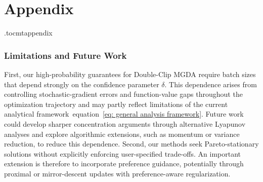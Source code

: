 \documentclass[twoside]{article} %
\def\eqref#1{equation~\ref{#1}}
\theoremstyle{plain}
\theoremstyle{definition}
\theoremstyle{remark}
\begin{document}
\clearpage
\appendix
\onecolumn

\part*{Appendix}

\etocdepthtag.toc{mtappendix}
\etocsettocstyle
  {}
  {\vspace{1em}}
\tableofcontents
\clearpage

\allowdisplaybreaks
\section{Limitations and Future Work}
First, our high-probability guarantees for Double-Clip MGDA require batch sizes that depend strongly on the confidence parameter \(\delta\). This dependence arises from controlling stochastic-gradient errors and function-value gaps throughout the optimization trajectory and may partly reflect limitations of the current analytical framework~\eqref{eq: general analysis framework}. Future work could develop sharper concentration arguments through alternative Lyapunov analyses and explore algorithmic extensions, such as momentum or variance reduction, to reduce this dependence. Second, our methods seek Pareto-stationary solutions without explicitly enforcing user-specified trade-offs. An important extension is therefore to incorporate preference guidance, potentially through proximal or mirror-descent updates with preference-aware regularization.
\end{document}
